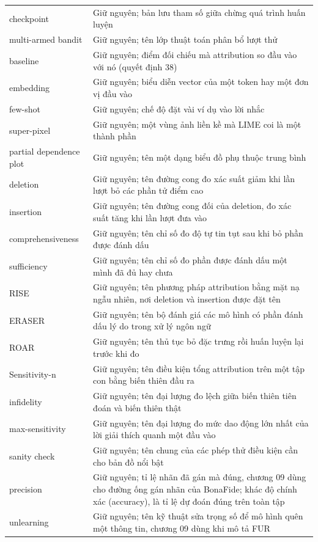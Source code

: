 \begin{longtable}{@{}lp{7cm}@{}}
checkpoint & Giữ nguyên; bản lưu tham số giữa chừng quá trình huấn luyện \\
multi-armed bandit & Giữ nguyên; tên lớp thuật toán phân bổ lượt thử \\
baseline & Giữ nguyên; điểm đối chiếu mà attribution so đầu vào với nó (quyết định 38) \\
embedding & Giữ nguyên; biểu diễn vector của một token hay một đơn vị đầu vào \\
few-shot & Giữ nguyên; chế độ đặt vài ví dụ vào lời nhắc \\
super-pixel & Giữ nguyên; một vùng ảnh liền kề mà LIME coi là một thành phần \\
partial dependence plot & Giữ nguyên; tên một dạng biểu đồ phụ thuộc trung bình \\
deletion & Giữ nguyên; tên đường cong đo xác suất giảm khi lần lượt bỏ các phần tử điểm cao \\
insertion & Giữ nguyên; tên đường cong đối của deletion, đo xác suất tăng khi lần lượt đưa vào \\
comprehensiveness & Giữ nguyên; tên chỉ số đo độ tự tin tụt sau khi bỏ phần được đánh dấu \\
sufficiency & Giữ nguyên; tên chỉ số đo phần được đánh dấu một mình đã đủ hay chưa \\
RISE & Giữ nguyên; tên phương pháp attribution bằng mặt nạ ngẫu nhiên, nơi deletion và insertion được đặt tên \\
ERASER & Giữ nguyên; tên bộ đánh giá các mô hình có phần đánh dấu lý do trong xử lý ngôn ngữ \\
ROAR & Giữ nguyên; tên thủ tục bỏ đặc trưng rồi huấn luyện lại trước khi đo \\
Sensitivity-n & Giữ nguyên; tên điều kiện tổng attribution trên một tập con bằng biến thiên đầu ra \\
infidelity & Giữ nguyên; tên đại lượng đo lệch giữa biến thiên tiên đoán và biến thiên thật \\
max-sensitivity & Giữ nguyên; tên đại lượng đo mức dao động lớn nhất của lời giải thích quanh một đầu vào \\
sanity check & Giữ nguyên; tên chung của các phép thử điều kiện cần cho bản đồ nổi bật \\
precision & Giữ nguyên; tỉ lệ nhãn đã gán mà đúng, chương 09 dùng cho đường ống gán nhãn của BonaFide; khác độ chính xác (accuracy), là tỉ lệ dự đoán đúng trên toàn tập \\
unlearning & Giữ nguyên; tên kỹ thuật sửa trọng số để mô hình quên một thông tin, chương 09 dùng khi mô tả FUR \\

\end{longtable}
